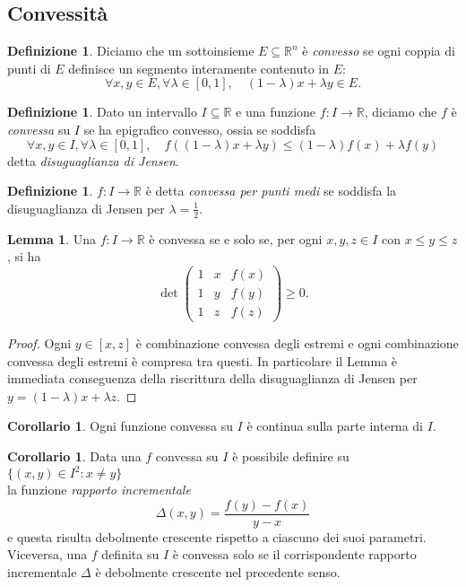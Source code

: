 \documentclass[a4paper,twoside]{article}
\newcommand{\R}{\mathbb{R}}
\theoremstyle{definition}
\newtheorem{lemma}[theorem]{Lemma}
\newtheorem{cor}[theorem]{Corollario}
\newtheorem{definizione}[theorem]{Definizione}
\numberwithin{theorem}{section}
\begin{document}
\subsection{Convessità}
\begin{definizione}
 Diciamo che un sottoinsieme $E\subseteq \R^n$ è \emph{convesso} se ogni coppia di punti di $E$ definisce un segmento interamente contenuto in $E$: 
 $$ \forall x,y\in E,\forall \lambda\in [0,1],\quad (1-\lambda)x+\lambda y \in E. $$
\end{definizione}
\begin{definizione}
 Dato un intervallo $I\subseteq\R$ e una funzione $f:I\to\R$, diciamo che $f$ è \emph{convessa} su $I$ se ha epigrafico convesso, ossia se soddisfa 
 $$ \forall x,y\in I,\forall \lambda\in[0,1],\quad f((1-\lambda)x + \lambda y) \leq (1-\lambda)f(x) + \lambda f(y) $$
 detta \emph{disuguaglianza di Jensen}.
\end{definizione}
\begin{definizione} $f:I\to\R$ è detta \emph{convessa per punti medi} se soddisfa la disuguaglianza di Jensen per $\lambda=\frac{1}{2}$.
\end{definizione}
\begin{lemma} Una $f:I\to\R$ è convessa se e solo se, per ogni $x,y,z\in I$ con $x\leq y\leq z$, si ha 
$$ \det \begin{pmatrix}1 & x & f(x) \\ 1 & y & f(y) \\ 1 & z & f(z) \end{pmatrix}\geq 0.$$
\end{lemma}
\begin{proof} Ogni $y\in[x,z]$ è combinazione convessa degli estremi e ogni combinazione convessa degli estremi è compresa tra questi. In particolare il Lemma è immediata conseguenza della riscrittura della disuguaglianza di Jensen per $y=(1-\lambda)x + \lambda z$. 
\end{proof}
\begin{cor} Ogni funzione convessa su $I$ è continua sulla parte interna di $I$. 
\end{cor}
\begin{cor} Data una $f$ convessa su $I$ è possibile definire su $\{(x,y)\in I^2: x\neq y\}$\\ la funzione \emph{rapporto incrementale} 
$$ \Delta(x,y) = \frac{f(y)-f(x)}{y-x} $$
e questa risulta debolmente crescente rispetto a ciascuno dei suoi parametri. Viceversa, una $f$ definita su $I$ è convessa solo se il corrispondente rapporto incrementale $\Delta$ è debolmente crescente nel precedente senso.
\end{cor}
\end{document}
